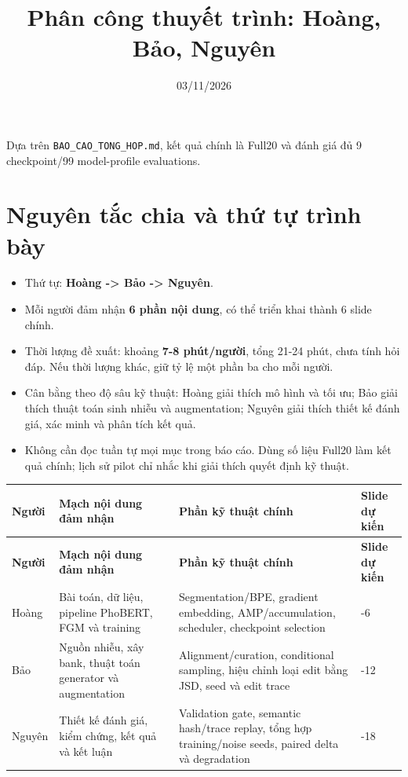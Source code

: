 \documentclass[11pt,a4paper]{article}
\title{Phân công thuyết trình: Hoàng, Bảo, Nguyên}
\author{}
\date{03/11/2026}
\newlength{\reporttablewidth}
\begin{document}
\raggedright
\maketitle
Dựa trên \texttt{BAO\_CAO\_TONG\_HOP.md}, kết quả chính là Full20 và đánh giá đủ 9 checkpoint/99 model-profile evaluations.


\FloatBarrier\section{Nguyên tắc chia và thứ tự trình bày}

\begin{itemize}

\item Thứ tự: \textbf{Hoàng -> Bảo -> Nguyên}.

\item Mỗi người đảm nhận \textbf{6 phần nội dung}, có thể triển khai thành 6 slide chính.

\item Thời lượng đề xuất: khoảng \textbf{7-8 phút/người}, tổng 21-24 phút, chưa tính hỏi đáp. Nếu thời lượng khác, giữ tỷ lệ một phần ba cho mỗi người.

\item Cân bằng theo độ sâu kỹ thuật: Hoàng giải thích mô hình và tối ưu; Bảo giải thích thuật toán sinh nhiễu và augmentation; Nguyên giải thích thiết kế đánh giá, xác minh và phân tích kết quả.

\item Không cần đọc tuần tự mọi mục trong báo cáo. Dùng số liệu Full20 làm kết quả chính; lịch sử pilot chỉ nhắc khi giải thích quyết định kỹ thuật.

\end{itemize}

\begingroup
\small
\setlength{\tabcolsep}{4pt}
\setlength{\reporttablewidth}{\dimexpr\linewidth-6\tabcolsep\relax}
\renewcommand{\arraystretch}{1.15}
\begin{longtable}{@{}>{\raggedright\arraybackslash}p{0.12000\reporttablewidth}>{\raggedright\arraybackslash}p{0.33000\reporttablewidth}>{\raggedright\arraybackslash}p{0.43000\reporttablewidth}>{\raggedright\arraybackslash}p{0.12000\reporttablewidth}@{}}
\toprule
\textbf{Người} & \textbf{Mạch nội dung đảm nhận} & \textbf{Phần kỹ thuật chính} & \textbf{Slide dự kiến} \\
\midrule
\endfirsthead
\toprule
\textbf{Người} & \textbf{Mạch nội dung đảm nhận} & \textbf{Phần kỹ thuật chính} & \textbf{Slide dự kiến} \\
\midrule
\endhead
\bottomrule
\endlastfoot
Hoàng & Bài toán, dữ liệu, pipeline PhoBERT, FGM và training & Segmentation/BPE, gradient embedding, AMP/accumulation, scheduler, checkpoint selection & 1-6 \\
Bảo & Nguồn nhiễu, xây bank, thuật toán generator và augmentation & Alignment/curation, conditional sampling, hiệu chỉnh loại edit bằng JSD, seed và edit trace & 7-12 \\
Nguyên & Thiết kế đánh giá, kiểm chứng, kết quả và kết luận & Validation gate, semantic hash/trace replay, tổng hợp training/noise seeds, paired delta và degradation & 13-18 \\
\end{longtable}
\endgroup
\end{document}
